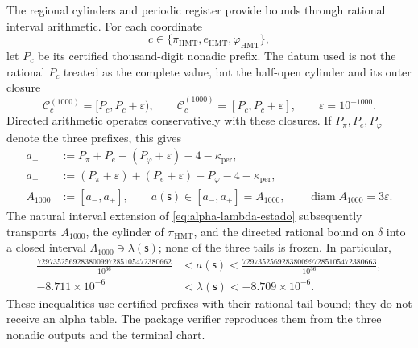 The regional cylinders and periodic register provide bounds through
rational interval arithmetic. For each coordinate
\[
 c\in\{\pi_{\mathrm{HMT}},e_{\mathrm{HMT}},\varphi_{\mathrm{HMT}}\},
\]
let \(P_c\) be its certified thousand-digit nonadic prefix. The datum used
is not the rational \(P_c\) treated as the complete value, but the half-open
cylinder and its outer closure
\[
 \mathcal C_c^{(1000)}=[P_c,P_c+\varepsilon),
 \qquad
 \overline{\mathcal C}_c^{(1000)}=[P_c,P_c+\varepsilon],
 \qquad \varepsilon=10^{-1000}.
\]
Directed arithmetic operates conservatively with these closures. If
\(P_\pi,P_e,P_\varphi\) denote the three prefixes, this gives
\begin{equation}
\begin{aligned}
 a_-&:=P_\pi+P_e-(P_\varphi+\varepsilon)-4-
       \kappa_{\mathrm{per}},\\
 a_+&:=(P_\pi+\varepsilon)+(P_e+\varepsilon)-P_\varphi-4-
       \kappa_{\mathrm{per}},\\
 A_{1000}&:=[a_-,a_+],
 \qquad a(\mathsf s)\in[a_-,a_+]=A_{1000},
 \qquad \operatorname{diam}A_{1000}=3\varepsilon.
\end{aligned}
\label{eq:alpha-propagacion-colas-rev08}
\end{equation}
The natural interval extension of
\eqref{eq:alpha-lambda-estado} subsequently transports \(A_{1000}\), the cylinder
of \(\pi_{\mathrm{HMT}}\), and the directed rational bound on \(\delta\) into a
closed interval \(\Lambda_{1000}\ni\lambda(\mathsf s)\); none of the three
tails is frozen. In particular,
\begin{equation}
\begin{aligned}
 \frac{7297352569283800997285105472380662}{10^{36}}
 &<a(\mathsf s)<
 \frac{7297352569283800997285105472380663}{10^{36}},\\
 -8.711\mathbin{\times}10^{-6}
 &<\lambda(\mathsf s)<-8.709\mathbin{\times}10^{-6}.
\end{aligned}
 \label{eq:alpha-cotas-precoordenada-lambda}
\end{equation}
These inequalities use certified prefixes with their rational tail bound;
they do not receive an alpha table. The package verifier reproduces them
from the three nonadic outputs and the terminal chart.


